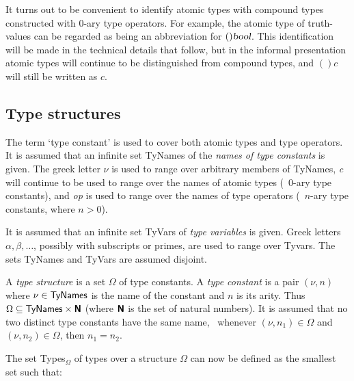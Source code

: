 It turns out to be convenient to identify atomic types with
compound types constructed with $0$-ary type operators.  For example,
the atomic type  of truth-values can be regarded as being an
abbreviation for $()\textsl{bool}$.  This identification will be made in
the technical details that follow, but in the informal presentation
atomic types will continue to be distinguished from compound types,
and $()c$ will still be written as $c$.

\subsection{Type structures}
\label{type structures}

The term `type constant' is used to cover both atomic types and type
operators.  It is assumed that an infinite set {\sf
TyNames} of the {\em names of type constants\/} is given.  The greek
letter $\nu$ is used to range over arbitrary members of {\sf TyNames},
\textsl{c} will continue to be used to range over the names of atomic
types (\ie\ $0$-ary type constants), and \textsl{op} is used to range
over the names of type operators (\ie\ $n$-ary type constants, where
$n>0$).

It is assumed that an infinite set {\sf TyVars} of {\em type
variables\/}
 is given.  Greek letters $\alpha,\beta,\ldots$, possibly with
subscripts or primes, are used to range over {\sf Tyvars}.  The sets
{\sf TyNames} and {\sf TyVars} are assumed disjoint.

A {\it type structure\/} is a set $\Omega$ of type constants. A {\it
type constant\/} is a pair $(\nu,n)$ where $\nu\in{\sf TyNames}$ is the
name of the constant and $n$ is its arity.  Thus $\Omega\subseteq{\sf
TyNames}\times\mbox{${\sf N}\!\!\!\!{\sf N}$}$ (where $\mbox{${\sf N}\!\!\!\!{\sf N}$}$ is the set of natural
numbers).  It is assumed that no two distinct type constants have the
same name,
\ie\ whenever $(\nu, n_1)\in\Omega$ and
$(\nu, n_2)\in\Omega$, then $n_1 = n_2$.

The set {\sf Types}$_{\Omega}$ of types over a structure ${\Omega}$
can now be defined as the smallest set such that:

